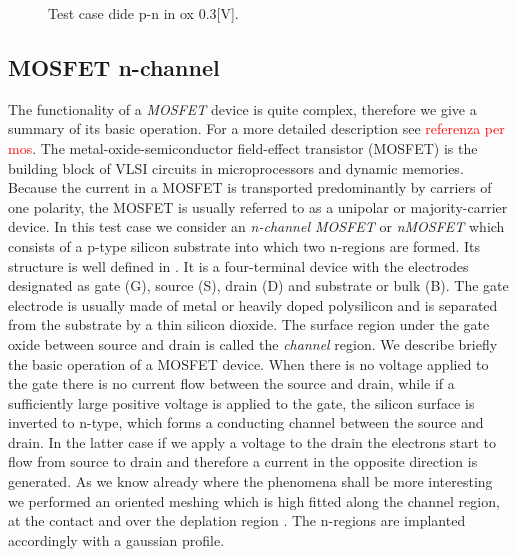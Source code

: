 \vspace{0.5cm}

\begin{figure}[!h]
\centering
{}
\hspace{1cm}
\caption{Test case dide p-n in ox 0.3[V].}
\label{fig: hdensity diodeox}
\end{figure}

\clearpage









\subsection{MOSFET n-channel}
\label{sec: MOS}

The functionality of a \textit{MOSFET} device is quite complex, therefore we give a summary of its basic operation. For a more detailed description see \textcolor{red}{referenza per mos}.
The metal-oxide-semiconductor field-effect transistor (MOSFET) is the building block of VLSI circuits in microprocessors and dynamic memories. Because the current in a MOSFET is transported predominantly by carriers of one polarity, the MOSFET is usually referred to as a unipolar or majority-carrier device.
In this test case we consider an \textit{n-channel MOSFET} or \textit{nMOSFET} which consists of a p-type silicon substrate into which two n-regions are formed. 
Its structure is well defined in . It is a four-terminal device with the electrodes designated as gate (G), source (S), drain (D) and substrate or bulk (B). The gate electrode is usually made of metal or heavily doped polysilicon and is separated from the substrate by a thin silicon dioxide. The surface region under the gate  oxide between source and drain is called the \textit{channel} region.
We describe briefly the basic operation of a MOSFET device.
When there is no voltage applied to the gate there is no current flow between the source and drain, while if a sufficiently large positive voltage is applied to the gate, the silicon surface is inverted to n-type, which forms a conducting channel between the source and drain. In the latter case if we apply a voltage to the drain the electrons start to flow from source to drain and therefore a current in the opposite direction is generated. 
As we know already where the phenomena shall be more interesting we performed an oriented meshing which is high fitted along the channel region, at the contact and over the deplation region . The n-regions are implanted accordingly with a gaussian profile.


